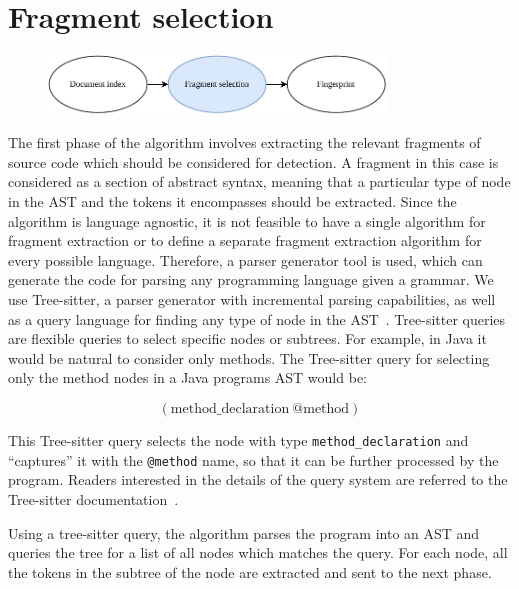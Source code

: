 \section{Fragment selection}

\begin{figure}[H]
    \begin{center}
        \includegraphics[width=0.8\textwidth]{figures/phases/phases_fragmentselection.drawio.pdf}
    \end{center}
\end{figure}

The first phase of the algorithm involves extracting the relevant fragments of source code
which should be considered for detection. A fragment in this case is considered as a
section of abstract syntax, meaning that a particular type of node in the AST and the
tokens it encompasses should be extracted. Since the algorithm is language agnostic, it is
not feasible to have a single algorithm for fragment extraction or to define a separate
fragment extraction algorithm for every possible language. Therefore, a parser generator
tool is used, which can generate the code for parsing any programming language given a
grammar. We use Tree-sitter, a parser generator with incremental parsing capabilities, as
well as a query language for finding any type of node in the AST~\cite{treesitter}.
Tree-sitter queries are flexible queries to select specific nodes or subtrees. For
example, in Java it would be natural to consider only methods. The Tree-sitter query for
selecting only the method nodes in a Java programs AST would be:

\begin{equation}
    (\mathrm{method\_declaration\ } \text{@method})
\end{equation}

This Tree-sitter query selects the node with type \verb|method_declaration| and
``captures'' it with the \verb|@method| name, so that it can be further processed by the
program. Readers interested in the details of the query system are referred to the
Tree-sitter documentation~\cite{treesitter}.

Using a tree-sitter query, the algorithm parses the program into an AST and queries the
tree for a list of all nodes which matches the query. For each node, all the tokens in the
subtree of the node are extracted and sent to the next phase.

